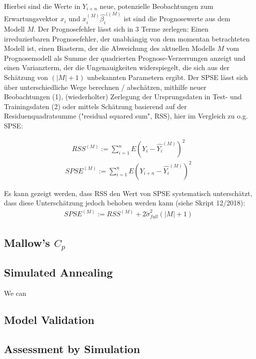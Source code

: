 	Hierbei sind die Werte in $Y_{i+n}$ neue, potenzielle Beobachtungen zum Erwartungsvektor $x_i$ und $x_{i}^{(M)}\hat{\beta_i}^{((M)}$ ist sind die Prognosewerte aus dem Modell $M$. 
	Der Prognosefehler lässt sich in 3 Terme zerlegen: Einen irreduzierbaren Prognosefehler, der unabhängig von dem momentan betrachteten Modell ist, einen Biasterm, der die Abweichung des aktuellen Modells $M$ vom Prognosemodell als Summe der quadrierten Prognose-Verzerrungen anzeigt und einen Varianzterm, der die Ungenauigkeiten widerspiegelt, die sich aus der Schätzung von $(|M|+1)$ unbekannten Parametern ergibt. 
	Der SPSE lässt sich über unterschiedliche Wege berechnen / abschätzen, mithilfe neuer Beobachtungen (1), (wiederholter) Zerlegung der Ursprungsdaten in Test- und Trainingsdaten (2) oder mittels Schätzung basierend auf der Residuenquadratsumme ("residual squared sum", RSS), hier im Vergleich zu o.g. SPSE:
	 
	\begin{align}
	RSS^{(M)} := \sum_{i=1}^{n} E (Y_{i} - \hat{Y_i}^{(M)})^2
	\end{align}
	\begin{align}
	SPSE^{(M)} := \sum_{i=1}^{n} E (Y_{i+n} - \hat{Y_i}^{(M)})^2
	\end{align}

	Es kann gezeigt werden, dass RSS den Wert von SPSE systematisch unterschätzt, dass diese Unterschätzung jedoch behoben werden kann (siehe Skript 12/2018): 
	\begin{align}
	SPSE^{(M)} := RSS^{(M)} + 2 \tilde{\sigma}_{\underline{full}} ^2 (|M|+1)
	\end{align}
	


	\subsection{Mallow's $C_{p}$}
	\label{ssec:mallows-C_p}
	

	\subsection{Simulated Annealing}
	\label{ssec:model-selec}
	
		We can 

		
	\subsection{Model Validation}
	\label{ssec:model-validation}
	
	
	
	\subsection{Assessment by Simulation}
	\label{ssec:simulation}
	
		
		
